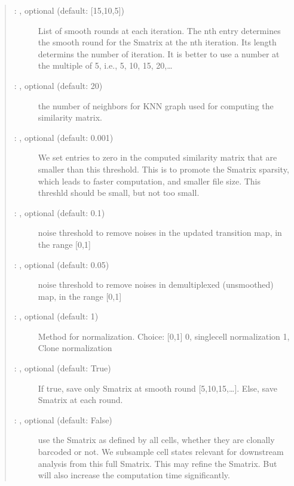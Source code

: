 \documentclass[letterpaper,10pt,english]{sphinxmanual}
\begin{document}
\begin{fulllineitems}
\begin{quote}
\begin{description}
\begin{description}
\item[{ : , optional (default: {[}15,10,5{]})}] \leavevmode
List of smooth rounds at each iteration.
The n\sphinxhyphen{}th entry determines the smooth round for the Smatrix
at the n\sphinxhyphen{}th iteration. Its length determins the number of
iteration. It is better to use a number at the multiple of
5, i.e., 5, 10, 15, 20,…

\item[{ : , optional (default: 20)}] \leavevmode
the number of neighbors for KNN graph used for computing the similarity matrix.

\item[{ : , optional (default: 0.001)}] \leavevmode
We set entries to zero in the computed similarity matrix that
are smaller than this threshold. This is to promote the Smatrix sparsity, which
leads to faster computation, and smaller file size.
This threshld should be small, but not too small.

\item[{ : , optional (default: 0.1)}] \leavevmode
noise threshold to remove noises in the updated transition map,
in the range {[}0,1{]}

\item[{ : , optional (default: 0.05)}] \leavevmode
noise threshold to remove noises in demultiplexed (un\sphinxhyphen{}smoothed) map,
in the range {[}0,1{]}

\item[{ : , optional (default: 1)}] \leavevmode
Method for normalization. Choice: {[}0,1{]}
0, single\sphinxhyphen{}cell normalization
1, Clone normalization

\item[{ : , optional (default: True)}] \leavevmode
If true, save only Smatrix at smooth round {[}5,10,15,…{]}.
Else, save Smatrix at each round.

\item[{ : , optional (default: False)}] \leavevmode
use the Smatrix as defined by all cells, whether they are clonally
barcoded or not. We sub\sphinxhyphen{}sample cell states relevant for downstream
analysis from this full Smatrix. This may refine the Smatrix.
But will also increase the computation time significantly.


\end{description}
\end{description}
\end{quote}
\end{fulllineitems}
\end{document}
